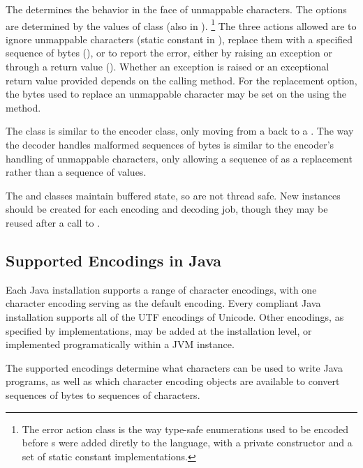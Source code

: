 The  determines the behavior in the face of
unmappable characters.  The options are determined by the values of
class  (also in ).%
%
\footnote{The error action class is the way type-safe enumerations used to
be encoded before s were added diretly to the language, with
a private constructor and a set of static constant implementations.}%
%
The three actions allowed are to ignore unmappable characters (static
constant  in ), replace them with
a specified sequence of bytes (), or to report the
error, either by raising an exception or through a return value
().  Whether an exception is raised or an exceptional return
value provided depends on the calling method.  For the replacement option,
the bytes used to replace an unmappable character may be set on the
 using the  method.

The  class is similar to the encoder class, only
moving from a  back to a .  The way
the decoder handles malformed sequences of bytes is similar to the
encoder's handling of unmappable characters, only allowing a sequence
of  as a replacement rather than a sequence of 
values.

The  and  classes maintain
buffered state, so are not thread safe.  New instances should be
created for each encoding and decoding job, though they may be reused
after a call to .



\subsection{Supported Encodings in Java}\label{section:supported-encodings}

Each Java installation supports a range of character encodings, with
one character encoding serving as the default encoding.  Every
compliant Java installation supports all of the UTF encodings of
Unicode.  Other encodings, as specified by 
implementations, may be added at the installation level, or
implemented programatically within a JVM instance.

The supported encodings determine what characters can be used to write
Java programs, as well as which character encoding objects are
available to convert sequences of bytes to sequences of characters.

